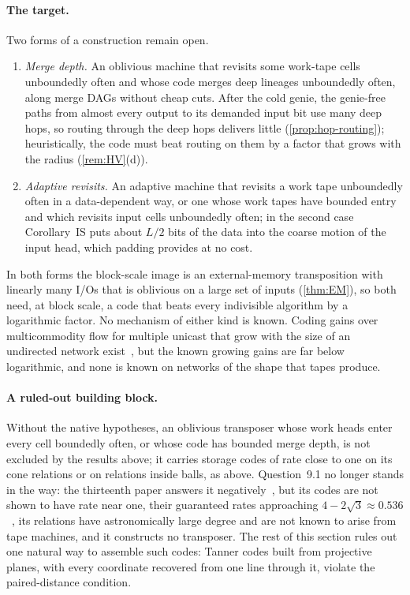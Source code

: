 \paragraph{The target.} Two forms of a construction remain open.
\begin{enumerate}[label=(\roman*)]
\item \emph{Merge depth.} An oblivious machine that revisits some work-tape cells unboundedly often and whose code merges
deep lineages unboundedly often, along merge DAGs without cheap cuts. After the cold genie, the genie-free paths from
almost every output to its demanded input bit use many deep hops, so routing through the deep hops delivers little
(\cref{prop:hop-routing}); heuristically, the code must beat routing on them by a factor that grows with the radius
(\cref{rem:HV}(d)).
\item \emph{Adaptive revisits.} An adaptive machine that revisits a work tape unboundedly often in a data-dependent
way, or one whose work tapes have bounded entry and which revisits input cells unboundedly often; in the second case
Corollary~IS puts about $L/2$ bits of the data into the coarse motion of the input head, which padding provides at no
cost.
\end{enumerate}
In both forms the block-scale image is an external-memory transposition with linearly many I/Os that is oblivious on a
large set of inputs (\cref{thm:EM}), so both need, at block scale, a code that beats every indivisible algorithm by a
logarithmic factor. No mechanism of either kind is known. Coding gains over multicommodity flow for multiple unicast that
grow with the size of an undirected network exist~\cite{BravermanHe2026}, but the known growing gains are far below logarithmic, and none is known
on networks of the shape that tapes produce.

\paragraph{A ruled-out building block.} Without the native hypotheses, an oblivious transposer whose work heads enter
every cell boundedly often, or whose code has bounded merge depth, is not excluded by the results above; it carries
storage codes of rate close to one on its cone relations or on relations inside balls, as above. Question~9.1 no longer
stands in the way: the thirteenth paper answers it negatively~\cite[Theorem~A]{StorageCodes2026}, but its codes are not
shown to have rate near one, their guaranteed rates approaching
$4-2\sqrt3\approx0.536$~\cite[Theorem~A$^*$]{StorageCodes2026}, its relations have astronomically large degree and are
not known to arise from tape machines, and it constructs no transposer. The rest of this section rules out one natural way to assemble such codes: Tanner codes
built from projective planes, with every coordinate recovered from one line through it, violate the paired-distance
condition.


